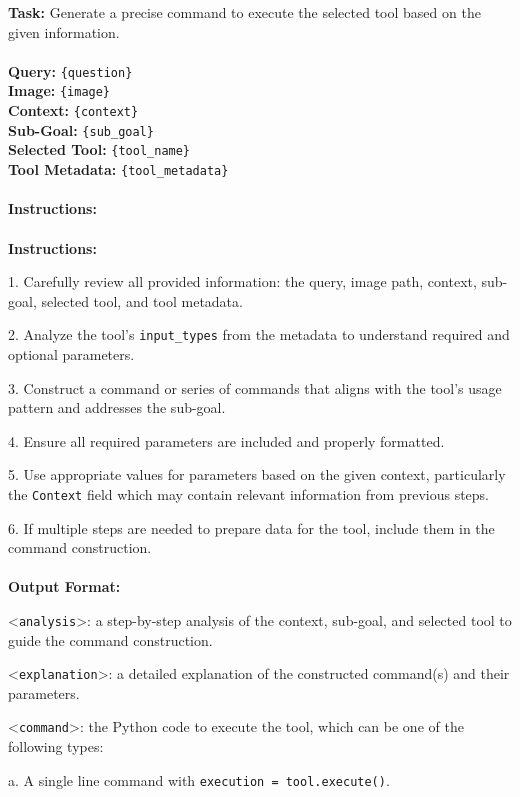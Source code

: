 \begin{textcolorbox}
\textbf{Task:} Generate a precise command to execute the selected tool based on the given information.
\\\\
\textbf{Query:} \texttt{\{question\}}
\\
\textbf{Image:} \texttt{\{image\}}
\\
\textbf{Context:} \texttt{\{context\}}
\\
\textbf{Sub-Goal:} \texttt{\{sub\_goal\}}
\\
\textbf{Selected Tool:} \texttt{\{tool\_name\}}
\\
\textbf{Tool Metadata:} \texttt{\{tool\_metadata\}}
\\\\
\textbf{Instructions:}
\\\\
\textbf{Instructions:}

1. Carefully review all provided information: the query, image path, context, sub-goal, selected tool, and tool metadata.

2. Analyze the tool's \texttt{input\_types} from the metadata to understand required and optional parameters.

3. Construct a command or series of commands that aligns with the tool's usage pattern and addresses the sub-goal.

4. Ensure all required parameters are included and properly formatted.

5. Use appropriate values for parameters based on the given context, particularly the \texttt{Context} field which may contain relevant information from previous steps.

6. If multiple steps are needed to prepare data for the tool, include them in the command construction.
\\\\
\textbf{Output Format:}

\textless{}\texttt{analysis}\textgreater{}: a step-by-step analysis of the context, sub-goal, and selected tool to guide the command construction.

\textless{}\texttt{explanation}\textgreater{}: a detailed explanation of the constructed command(s) and their parameters.

\textless{}\texttt{command}\textgreater{}: the Python code to execute the tool, which can be one of the following types:

\quad a. A single line command with \texttt{execution = tool.execute()}.


\end{textcolorbox}
